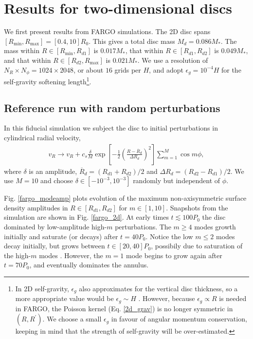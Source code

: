\section{Results for two-dimensional discs}
We first present results from FARGO simulations. The 2D disc spans
$[R_\mathrm{min}, R_\mathrm{max}] = [0.4,10]R_0$. This gives a total
disc mass $M_{d}=0.086M_*$. The mass within
$R\in[R_\mathrm{min},R_{d1}]$ is $0.017M_*$, that within
$R\in[R_{d1},R_{d2}]$ is $0.049M_*$, and that within
$R\in[R_{d2},R_\mathrm{max}]$ is $0.021M_*$. We use a resolution of
$N_R\times N_\phi = 1024\times 2048$, or about $16$ grids per $H$, and
adopt $\epsilon_g=10^{-4}H$ for the   
self-gravity softening length\footnote{In 2D self-gravity, $\epsilon_g$ also
  approximates for the vertical disc thickness, so a more appropriate
  value would be $\epsilon_g\sim H$ \citep{muller12}. However, because
  $\epsilon_g\propto R$ is needed in FARGO, the Poisson kernel
  (Eq. \ref{2d_grav}) is no longer symmetric in $(R,R^\prime)$. We
  choose a small  
  $\epsilon_g$ in favour of angular momentum conservation, keeping in
  mind that the strength of self-gravity will be over-estimated.}.

\subsection{Reference run with random perturbations}
In this fiducial simulation we subject the disc to initial perturbations in
cylindrical radial velocity, 
\begin{align}\label{randpert}
  v_R \to v_R+ c_s\frac{\delta}{M}
  \exp{\left[-\frac{1}{2}\left(\frac{R-\overline{R}_d}{\Delta 
          R_d}\right)^2\right]}\sum_{m=1}^M\cos{m\phi},
\end{align}
where $\delta$ is an amplitude, $\overline{R}_d = (R_{d1}+R_{d2})/2$
and $\Delta R_d = (R_{d2}-R_{d1})/2$. We use $M=10$ and choose 
$\delta\in[-10^{-3},10^{-3}]$ randomly but independent of $\phi$.  

Fig. \ref{fargo_modeamp} plots evolution of the maximum
non-axisymmetric surface density amplitudes in $R\in[R_{d1},R_{d2}]$
for $m\in[1,10]$. Snapshots from the simulation are shown in
Fig. \ref{fargo_2d}. 
At early times $t\lesssim100P_0$ the disc 
dominated by low-amplitude high-$m$ perturbations. The $m\geq4$ modes
growth initially and saturate (or decays) after $t=40P_0$. Notice the
low $m\leq 2$ modes decay initially, but grows between $t\in[20,40]P_0$,
possibily due to saturation of the high-$m$ modes  
\citep{laughlin96,laughlin97}. However, the $m=1$ mode begins to grow
again after $t=70P_0$, and eventually dominates the annulus. 

